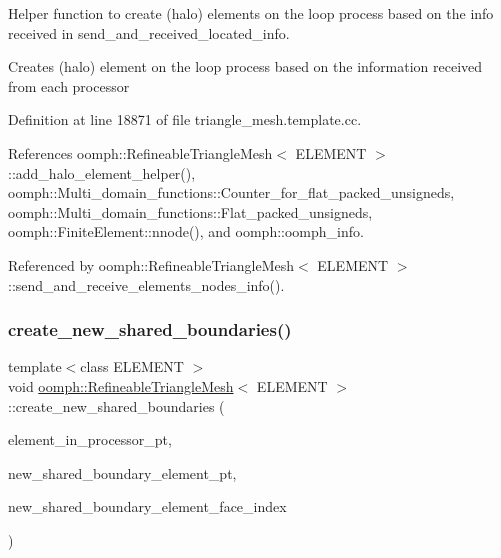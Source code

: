 Helper function to create (halo) elements on the loop process based on the info received in send\+\_\+and\+\_\+received\+\_\+located\+\_\+info. 

Creates (halo) element on the loop process based on the information received from each processor 

Definition at line 18871 of file triangle\+\_\+mesh.\+template.\+cc.



References oomph\+::\+Refineable\+Triangle\+Mesh$<$ E\+L\+E\+M\+E\+N\+T $>$\+::add\+\_\+halo\+\_\+element\+\_\+helper(), oomph\+::\+Multi\+\_\+domain\+\_\+functions\+::\+Counter\+\_\+for\+\_\+flat\+\_\+packed\+\_\+unsigneds, oomph\+::\+Multi\+\_\+domain\+\_\+functions\+::\+Flat\+\_\+packed\+\_\+unsigneds, oomph\+::\+Finite\+Element\+::nnode(), and oomph\+::oomph\+\_\+info.



Referenced by oomph\+::\+Refineable\+Triangle\+Mesh$<$ E\+L\+E\+M\+E\+N\+T $>$\+::send\+\_\+and\+\_\+receive\+\_\+elements\+\_\+nodes\+\_\+info().

\mbox{\label{classoomph_1_1RefineableTriangleMesh_adb26d1dbe4f06311599020171ec45140}} 
\subsubsection{\texorpdfstring{create\+\_\+new\+\_\+shared\+\_\+boundaries()}{create\_new\_shared\_boundaries()}}
{\footnotesize\ttfamily template$<$class E\+L\+E\+M\+E\+NT $>$ \\
void \hyperlink{classoomph_1_1RefineableTriangleMesh}{oomph\+::\+Refineable\+Triangle\+Mesh}$<$ E\+L\+E\+M\+E\+NT $>$\+::create\+\_\+new\+\_\+shared\+\_\+boundaries (\begin{DoxyParamCaption}\item[{std\+::set$<$ \hyperlink{classoomph_1_1FiniteElement}{Finite\+Element} $\ast$$>$ \&}]{element\+\_\+in\+\_\+processor\+\_\+pt,  }\item[{\hyperlink{classoomph_1_1Vector}{Vector}$<$ \hyperlink{classoomph_1_1Vector}{Vector}$<$ \hyperlink{classoomph_1_1FiniteElement}{Finite\+Element} $\ast$$>$ $>$ \&}]{new\+\_\+shared\+\_\+boundary\+\_\+element\+\_\+pt,  }\item[{\hyperlink{classoomph_1_1Vector}{Vector}$<$ \hyperlink{classoomph_1_1Vector}{Vector}$<$ unsigned $>$ $>$ \&}]{new\+\_\+shared\+\_\+boundary\+\_\+element\+\_\+face\+\_\+index }\end{DoxyParamCaption})}



